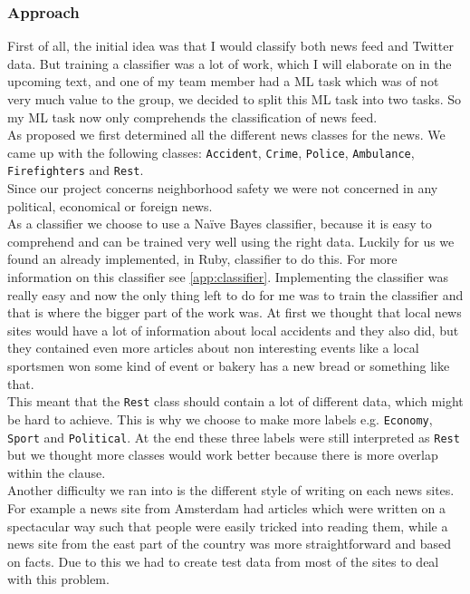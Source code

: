 \subsubsection*{Approach}
First of all, the initial idea was that I would classify both news feed and Twitter data. But training a classifier was a lot of work, which I will elaborate on in the upcoming text, and one of my team member had a ML task which was of not very much value to the group,
we decided to split this ML task into two tasks. So my ML task now only comprehends the classification of news feed.\\
As proposed we first determined all the different news classes for the news. We came up with the following classes: \texttt{Accident}, \texttt{Crime}, \texttt{Police}, \texttt{Ambulance}, \texttt{Firefighters} and \texttt{Rest}.\\
Since our project concerns neighborhood safety we were not concerned in any political, economical or foreign news.\\
As a classifier we choose to use a Na\"{i}ve Bayes classifier, because it is easy to comprehend and can be trained very well using the right data. 
Luckily for us we found an already implemented, in Ruby, classifier to do this. For more information on this classifier see \autoref{app:classifier}.
Implementing the classifier was really easy and now the only thing left to do for me was to train the classifier and that is where the bigger part of the work was. 
At first we thought that local news sites would have a lot of information about local accidents and they also did, but they contained even more articles about non interesting events like a local sportsmen won some kind of event or bakery has a new bread or something like that. \\
This meant that the \texttt{Rest} class should contain a lot of different data, which might be hard to achieve. This is why we choose to make more labels e.g. \texttt{Economy}, \texttt{Sport} and \texttt{Political}. At the end these three labels were still interpreted as \texttt{Rest} but we thought more classes would work better because there is more overlap within the clause.\\
Another difficulty we ran into is the different style of writing on each news sites. For example a news site from Amsterdam had articles which were written on a spectacular way such that people were easily tricked into reading them, while a news site from the east part of the country was more straightforward and based on facts. Due to this we had to create test data from most of the sites to deal with this problem. \\
